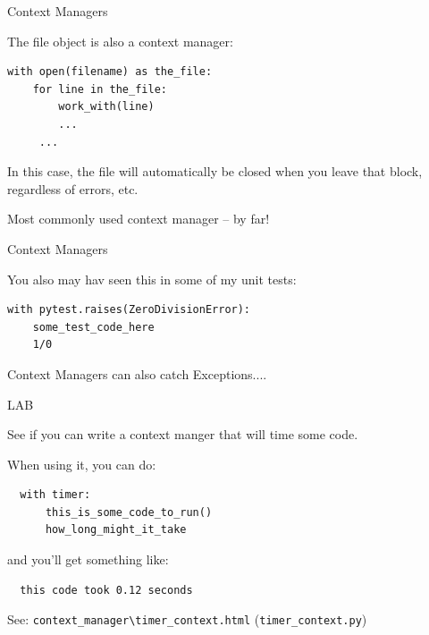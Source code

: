 \documentclass{beamer}
\begin{document}
\begin{frame}[fragile]{Context Managers}

{\Large The file object is also a context manager:}

\begin{verbatim}
with open(filename) as the_file:
    for line in the_file:
        work_with(line)
        ...
     ...
\end{verbatim}

\vfill

{\Large In this case, the file will automatically be closed when you leave that block, regardless of errors, etc.}
\vfill

{\Large Most commonly used context manager -- by far!}

\end{frame} 

\begin{frame}[fragile]{Context Managers}

{\Large You also may hav seen this in some of my unit tests:}

\begin{verbatim}
with pytest.raises(ZeroDivisionError):
    some_test_code_here
    1/0
\end{verbatim}

\vfill

{\Large Context Managers can also catch Exceptions....}
\vfill

\end{frame} 

\begin{frame}[fragile]{LAB}

{\Large See if you can write a context manger that will time some code.}

{\large When using it, you can do:}
\begin{verbatim}
  with timer:
      this_is_some_code_to_run()
      how_long_might_it_take
\end{verbatim}

{\large and you'll get something like:}

\begin{verbatim}
  this code took 0.12 seconds
\end{verbatim}

\vfill
{\large See: \verb`context_manager\timer_context.html` (\verb`timer_context.py`) }

\end{frame}
\end{document}
